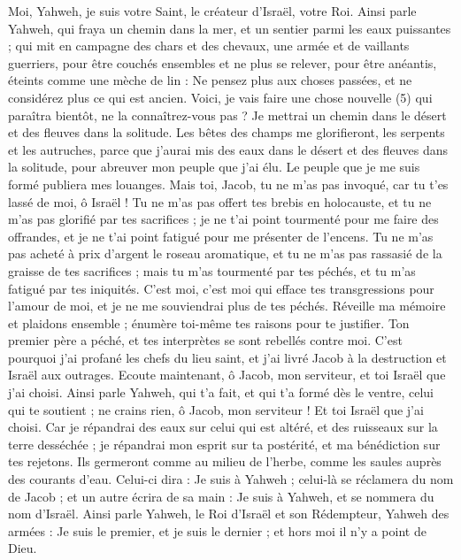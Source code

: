 \begin{multicols}{2}
Moi, Yahweh, je suis votre Saint, le créateur d'Israël, votre Roi.
Ainsi parle Yahweh, qui fraya un chemin dans la mer, et un sentier parmi les eaux puissantes ;
qui mit en campagne des chars et des chevaux, une armée et de vaillants guerriers, pour être couchés ensembles et ne plus se relever, pour être anéantis, éteints comme une mèche de lin :
Ne pensez plus aux choses passées, et ne considérez plus ce qui est ancien.
Voici, je vais faire une chose nouvelle (5) qui paraîtra bientôt, ne la connaîtrez-vous pas ? Je mettrai un chemin dans le désert et des fleuves dans la solitude.
Les bêtes des champs me glorifieront, les serpents et les autruches, parce que j'aurai mis des eaux dans le désert et des fleuves dans la solitude, pour abreuver mon peuple que j'ai élu.
Le peuple que je me suis formé publiera mes louanges.
Mais toi, Jacob, tu ne m'as pas invoqué, car tu t'es lassé de moi, ô Israël !
Tu ne m'as pas offert tes brebis en holocauste, et tu ne m'as pas glorifié par tes sacrifices ; je ne t'ai point tourmenté pour me faire des offrandes, et je ne t'ai point fatigué pour me présenter de l'encens.
Tu ne m'as pas acheté à prix d'argent le roseau aromatique, et tu ne m'as pas rassasié de la graisse de tes sacrifices ; mais tu m'as tourmenté par tes péchés, et tu m'as fatigué par tes iniquités.
C'est moi, c'est moi qui efface tes transgressions pour l'amour de moi, et je ne me souviendrai plus de tes péchés.
Réveille ma mémoire et plaidons ensemble ; énumère toi-même tes raisons pour te justifier.
Ton premier père a péché, et tes interprètes se sont rebellés contre moi.
C'est pourquoi j’ai profané les chefs du lieu saint, et j’ai livré Jacob à la destruction et Israël aux outrages.
\VerseOne{}Ecoute maintenant, ô Jacob, mon serviteur, et toi Israël que j'ai choisi.
Ainsi parle Yahweh, qui t'a fait, et qui t’a formé dès le ventre, celui qui te soutient ; ne crains rien, ô Jacob, mon serviteur ! Et toi Israël que j'ai choisi.
Car je répandrai des eaux sur celui qui est altéré, et des ruisseaux sur la terre desséchée ; je répandrai mon esprit sur ta postérité, et ma bénédiction sur tes rejetons.
Ils germeront comme au milieu de l’herbe, comme les saules auprès des courants d’eau.
Celui-ci dira : Je suis à Yahweh ; celui-là se réclamera du nom de Jacob ; et un autre écrira de sa main : Je suis à Yahweh, et se nommera du nom d'Israël.
Ainsi parle Yahweh, le Roi d'Israël et son Rédempteur, Yahweh des armées : Je suis le premier, et je suis le dernier ; et hors moi il n'y a point de Dieu.

\end{multicols}
